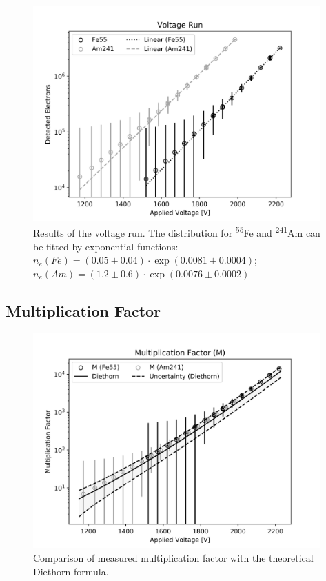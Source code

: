 \begin{figure}[H]
  \centering
  \includegraphics[width=11cm]{voltageRun.png}
  \caption{Results of the voltage run. The distribution for \textsuperscript{55}Fe and \textsuperscript{241}Am can be fitted by exponential functions: $n_{e}(Fe) = (0.05\pm0.04)\cdot\exp{(0.0081\pm0.0004)}$; $n_{e}(Am) = (1.2\pm0.6)\cdot\exp{(0.0076\pm0.0002)}$}
  \label{fig:voltageRun}
\end{figure}

\subsection{Multiplication Factor}

\begin{figure}[H]
  \centering
  \includegraphics[width=11cm]{mFactor.png}
  \caption{Comparison of measured multiplication factor with the theoretical Diethorn formula.}
  \label{fig:mFactor}
\end{figure}

